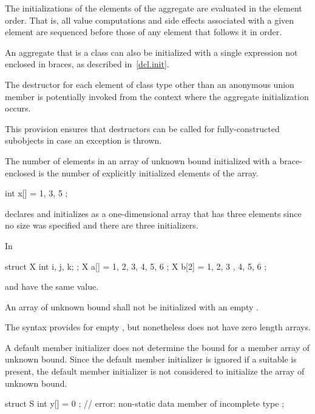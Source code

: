 \pnum
The initializations of the elements of the aggregate
are evaluated in the element order.
That is,
all value computations and side effects associated with a given element
are sequenced before
those of any element that follows it in order.

\pnum
An aggregate that is a class can also be initialized with a single
expression not enclosed in braces, as described in~\ref{dcl.init}.

\pnum
The destructor for each element of class type
other than an anonymous union member
is potentially invoked
from the context where the aggregate initialization occurs.
\begin{note}
This provision ensures that destructors can be called
for fully-constructed subobjects
in case an exception is thrown.
\end{note}

\pnum
The number of elements in an array of unknown bound
initialized with a brace-enclosed 
is the number of explicitly initialized elements of the array.
\begin{example}
\begin{codeblock}
int x[] = { 1, 3, 5 };
\end{codeblock}
declares and initializes
as a one-dimensional array that has three elements
since no size was specified and there are three initializers.
\end{example}
\begin{example}
In
\begin{codeblock}
struct X { int i, j, k; };
X a[] = { 1, 2, 3, 4, 5, 6 };
X b[2] = { { 1, 2, 3 }, { 4, 5, 6 } };
\end{codeblock}
 and  have the same value.
\end{example}
An array of unknown bound shall not be initialized with
an empty  \tcode{\{\}}.
\begin{footnote}
The syntax provides for empty ,
but nonetheless \Cpp{} does not have zero length arrays.
\end{footnote}
\begin{note}
A default member initializer does not determine the bound for a member
array of unknown bound.  Since the default member initializer is
ignored if a suitable  is present,
the default member initializer is not
considered to initialize the array of unknown bound.
\begin{example}
\begin{codeblock}
struct S {
  int y[] = { 0 };          // error: non-static data member of incomplete type
};
\end{codeblock}
\end{example}
\end{note}

